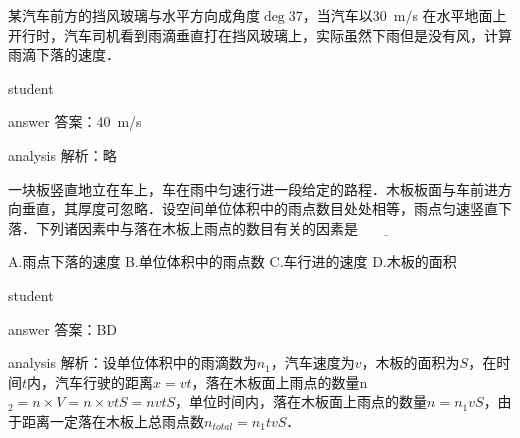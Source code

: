 \begin{example}
	某汽车前方的挡风玻璃与水平方向成角度$\deg{37}$，当汽车以\SI{30}{m/s} 在水平地面上开行时，汽车司机看到雨滴垂直打在挡风玻璃上，实际虽然下雨但是没有风，计算雨滴下落的速度．
	
	\begin{taggedblock}{student}
		\vspace*{2cm}
	\end{taggedblock}
	
	
	\begin{taggedblock}{answer}
		答案：\SI{40}{m/s}
	\end{taggedblock}
	\begin{taggedblock}{analysis}
		解析：略
	\end{taggedblock}
\end{example}


\begin{example}
	 一块板竖直地立在车上，车在雨中匀速行进一段给定的路程．木板板面与车前进方向垂直，其厚度可忽略．设空间单位体积中的雨点数目处处相等，雨点匀速竖直下落．下列诸因素中与落在木板上雨点的数目有关的因素是$ \underline{\qquad\qquad} $
	 
	 \begin{center}
	 	\small
	 		A.雨点下落的速度 \qquad  B.单位体积中的雨点数  \qquad C.车行进的速度  \qquad D.木板的面积
	 \end{center}

	
	
	\begin{taggedblock}{student}
		\vspace*{1cm}
	\end{taggedblock}
	
	
	\begin{taggedblock}{answer}
		答案：BD
	\end{taggedblock}


	\begin{taggedblock}{analysis}
		解析：设单位体积中的雨滴数为$n_1$，汽车速度为$ v $，木板的面积为$S  $，在时间$ t $内，汽车行驶的距离$ x=vt $，落在木板面上雨点的数量n$ _2=n×V=n×vtS=nvtS $，单位时间内，落在木板面上雨点的数量$ n=n_1 vS $，由于距离一定落在木板上总雨点数$ n_{total}=n_1 tvS $．
	\end{taggedblock}
\end{example}




